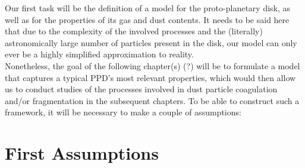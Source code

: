 Our first task will be the definition of a model for the proto-planetary disk, as well as for
the properties of its gas and dust contents. It needs to be said here that due to the complexity of
the involved processes and the (literally) astronomically large number of particles present in the 
disk, our model can only ever be a highly simplified approximation to reality. \\

Nonetheless, the goal of the following chapter(s) (?) will be to formulate a model that captures a 
typical PPD's most relevant properties, which would then allow us to conduct studies of the 
processes involved in dust particle coagulation and/or fragmentation in the subsequent chapters. 
To be able to construct such a framework, it will be necessary to make a couple of assumptions:


\section{First Assumptions}
\label{sec:first_assumptions_about_the_disk}

